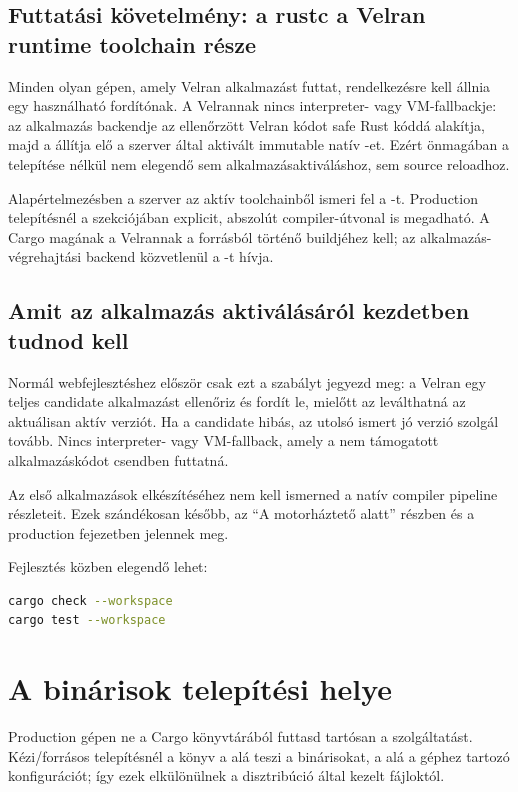 \subsection*{Futtatási követelmény: a rustc a Velran runtime toolchain része}

Minden olyan gépen, amely Velran alkalmazást futtat, rendelkezésre kell állnia egy használható  fordítónak. A Velrannak nincs interpreter- vagy VM-fallbackje: az alkalmazás backendje az ellenőrzött Velran kódot safe Rust kóddá alakítja, majd a  állítja elő a szerver által aktivált immutable natív -et. Ezért önmagában a  telepítése  nélkül nem elegendő sem alkalmazásaktiváláshoz, sem source reloadhoz.

Alapértelmezésben a szerver az aktív toolchainből ismeri fel a -t. Production telepítésnél a  \code{[native]} szekciójában explicit, abszolút compiler-útvonal is megadható. A Cargo magának a Velrannak a forrásból történő buildjéhez kell; az alkalmazás-végrehajtási backend közvetlenül a -t hívja.

\subsection*{Amit az alkalmazás aktiválásáról kezdetben tudnod kell}

Normál webfejlesztéshez először csak ezt a szabályt jegyezd meg: a Velran egy teljes candidate alkalmazást ellenőriz és fordít le, mielőtt az leválthatná az aktuálisan aktív verziót. Ha a candidate hibás, az utolsó ismert jó verzió szolgál tovább. Nincs interpreter- vagy VM-fallback, amely a nem támogatott alkalmazáskódot csendben futtatná.

Az első alkalmazások elkészítéséhez nem kell ismerned a natív compiler pipeline részleteit. Ezek szándékosan később, az ``A motorháztető alatt'' részben és a production fejezetben jelennek meg.

Fejlesztés közben elegendő lehet:

\begin{lstlisting}[language=bash]
cargo check --workspace
cargo test --workspace
\end{lstlisting}

\section{A binárisok telepítési helye}

Production gépen ne a Cargo  könyvtárából futtasd tartósan a szolgáltatást. Kézi/forrásos telepítésnél a könyv a  alá teszi a binárisokat, a  alá a géphez tartozó konfigurációt; így ezek elkülönülnek a disztribúció által kezelt fájloktól.


